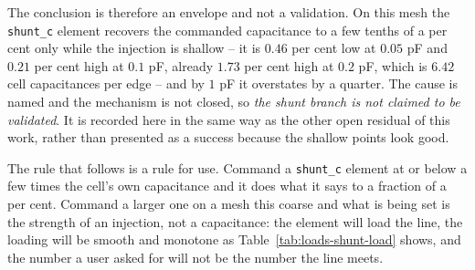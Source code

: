 The conclusion is therefore an envelope and not a validation. On this mesh the \texttt{shunt\_c} element
recovers the commanded capacitance to a few tenths of a per cent only while the injection is shallow -- it is
$0.46$ per cent low at $0.05$ pF and $0.21$ per cent high at $0.1$ pF, already $1.73$ per cent high at $0.2$ pF,
which is $6.42$ cell capacitances per edge -- and by $1$ pF it overstates by a quarter. The cause is named and
the mechanism is not closed, so \emph{the shunt branch is not claimed to be validated}. It is recorded here in the
same way as the other open residual of this work, rather than presented as a success because the shallow points
look good.

The rule that follows is a rule for use. Command a \texttt{shunt\_c} element at or below a few times the cell's
own capacitance and it does what it says to a fraction of a per cent. Command a larger one on a mesh this coarse
and what is being set is the strength of an injection, not a capacitance: the element will load the line, the
loading will be smooth and monotone as Table~\ref{tab:loads-shunt-load} shows, and the number a user asked for
will not be the number the line meets.
